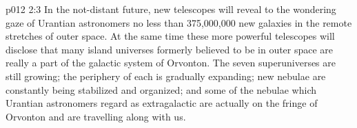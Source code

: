 \vs p012 2:3 In the not\hyp{}distant future, new telescopes will reveal to the wondering gaze of Urantian astronomers no less than 375,000,000 new galaxies in the remote stretches of outer space. At the same time these more powerful telescopes will disclose that many island universes formerly believed to be in outer space are really a part of the galactic system of Orvonton. The seven superuniverses are still growing; the periphery of each is gradually expanding; new nebulae are constantly being stabilized and organized; and some of the nebulae which Urantian astronomers regard as extragalactic are actually on the fringe of Orvonton and are travelling along with us.
